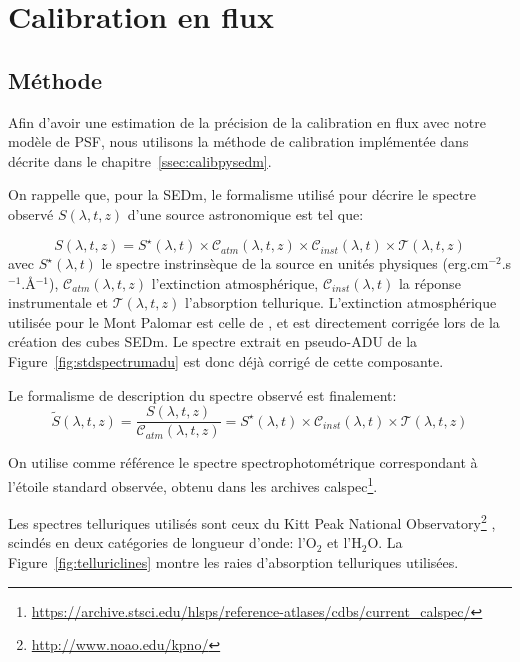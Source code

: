 \documentclass[../main/main.tex]{subfiles}
\begin{document}
\newpage
\section{Calibration en flux}\label{sec:validationpsf}

\subsection{Méthode}\label{ssec:photocalibstd}

Afin d'avoir une estimation de la précision de la calibration en flux
avec notre modèle de PSF, nous utilisons la
méthode de calibration implémentée dans  \citep{pysedm} décrite dans le
chapitre~\ref{ssec:calibpysedm}.

On rappelle que, pour la SEDm, le formalisme utilisé pour décrire le
spectre observé $S(\lambda,t,z)$ d'une source astronomique est tel que:

\begin{equation*} 
  S(\lambda,t,z)=S^{\star}(\lambda,t)\times\mathcal{C}_{atm}(\lambda,t,z)\times\mathcal{C}_{inst}(\lambda,t)\times\mathcal{T}(\lambda,t,z)
\end{equation*}
avec $S^{\star}(\lambda,t)$ le spectre instrinsèque de la source en
unités physiques (erg.cm$^{-2}$.s$^{-1}$.\AA$^{-1}$), $\mathcal{C}_{atm}(\lambda,t,z)$
l'extinction atmosphérique, $\mathcal{C}_{inst}(\lambda,t)$ la réponse
instrumentale et $\mathcal{T}(\lambda,t,z)$ l'absorption tellurique. L'extinction
atmosphérique utilisée pour le Mont Palomar est celle de
\citep{Hayes1975atm}, et est directement corrigée lors de la création des cubes
SEDm. Le spectre extrait en pseudo-ADU de la
Figure~\ref{fig:stdspectrumadu} est donc déjà corrigé de cette composante.

Le formalisme de description du spectre observé est finalement:
\begin{equation*} 
  \tilde{S}(\lambda,t,z) = \frac{S(\lambda,t,z)}{\mathcal{C}_{atm}(\lambda,t,z)}=S^{\star}(\lambda,t)\times\mathcal{C}_{inst}(\lambda,t)\times\mathcal{T}(\lambda,t,z)
\end{equation*}

On utilise comme référence le spectre spectrophotométrique
correspondant à l'étoile standard observée, obtenu dans les archives
calspec\footnote{\url{https://archive.stsci.edu/hlsps/reference-atlases/cdbs/current_calspec/}}.

Les spectres
telluriques utilisés sont ceux du Kitt Peak National
Observatory\footnote{\url{http://www.noao.edu/kpno/}} \citep{Hinkle2003}, scindés en deux
catégories de longueur d'onde: l'$\text{O}_{2}$ et
l'$\text{H}_{2}\text{O}$. La Figure~\ref{fig:telluriclines} montre les
raies d'absorption telluriques utilisées.
\end{document}
